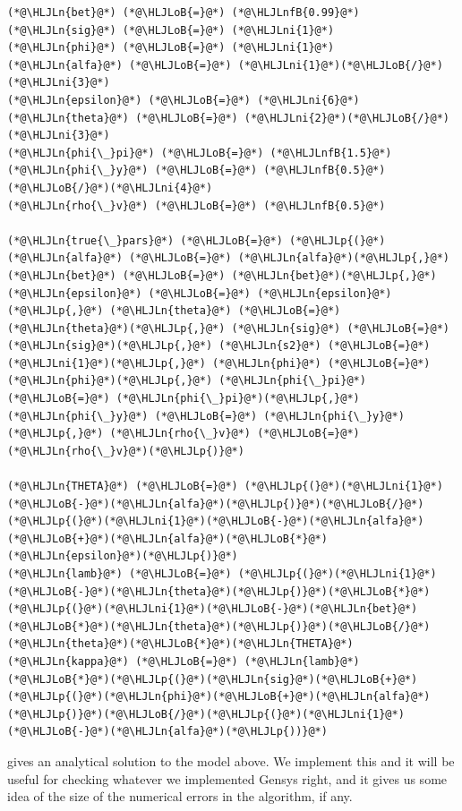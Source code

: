 \documentclass[12pt,a4paper]{article}
\newcommand{\HLJLn}[1]{#1}
\newcommand{\HLJLnfB}[1]{\textcolor[RGB]{59,151,46}{#1}}
\newcommand{\HLJLni}[1]{\textcolor[RGB]{59,151,46}{#1}}
\newcommand{\HLJLoB}[1]{\textcolor[RGB]{102,102,102}{\textbf{#1}}}
\newcommand{\HLJLp}[1]{#1}
\begin{document}
\begin{lstlisting}
(*@\HLJLn{bet}@*) (*@\HLJLoB{=}@*) (*@\HLJLnfB{0.99}@*)
(*@\HLJLn{sig}@*) (*@\HLJLoB{=}@*) (*@\HLJLni{1}@*)
(*@\HLJLn{phi}@*) (*@\HLJLoB{=}@*) (*@\HLJLni{1}@*)
(*@\HLJLn{alfa}@*) (*@\HLJLoB{=}@*) (*@\HLJLni{1}@*)(*@\HLJLoB{/}@*)(*@\HLJLni{3}@*)
(*@\HLJLn{epsilon}@*) (*@\HLJLoB{=}@*) (*@\HLJLni{6}@*)
(*@\HLJLn{theta}@*) (*@\HLJLoB{=}@*) (*@\HLJLni{2}@*)(*@\HLJLoB{/}@*)(*@\HLJLni{3}@*)
(*@\HLJLn{phi{\_}pi}@*) (*@\HLJLoB{=}@*) (*@\HLJLnfB{1.5}@*)
(*@\HLJLn{phi{\_}y}@*) (*@\HLJLoB{=}@*) (*@\HLJLnfB{0.5}@*)(*@\HLJLoB{/}@*)(*@\HLJLni{4}@*)
(*@\HLJLn{rho{\_}v}@*) (*@\HLJLoB{=}@*) (*@\HLJLnfB{0.5}@*)

(*@\HLJLn{true{\_}pars}@*) (*@\HLJLoB{=}@*) (*@\HLJLp{(}@*)(*@\HLJLn{alfa}@*) (*@\HLJLoB{=}@*) (*@\HLJLn{alfa}@*)(*@\HLJLp{,}@*) (*@\HLJLn{bet}@*) (*@\HLJLoB{=}@*) (*@\HLJLn{bet}@*)(*@\HLJLp{,}@*) (*@\HLJLn{epsilon}@*) (*@\HLJLoB{=}@*) (*@\HLJLn{epsilon}@*)(*@\HLJLp{,}@*) (*@\HLJLn{theta}@*) (*@\HLJLoB{=}@*) (*@\HLJLn{theta}@*)(*@\HLJLp{,}@*) (*@\HLJLn{sig}@*) (*@\HLJLoB{=}@*) (*@\HLJLn{sig}@*)(*@\HLJLp{,}@*) (*@\HLJLn{s2}@*) (*@\HLJLoB{=}@*) (*@\HLJLni{1}@*)(*@\HLJLp{,}@*) (*@\HLJLn{phi}@*) (*@\HLJLoB{=}@*) (*@\HLJLn{phi}@*)(*@\HLJLp{,}@*) (*@\HLJLn{phi{\_}pi}@*) (*@\HLJLoB{=}@*) (*@\HLJLn{phi{\_}pi}@*)(*@\HLJLp{,}@*) (*@\HLJLn{phi{\_}y}@*) (*@\HLJLoB{=}@*) (*@\HLJLn{phi{\_}y}@*)(*@\HLJLp{,}@*) (*@\HLJLn{rho{\_}v}@*) (*@\HLJLoB{=}@*) (*@\HLJLn{rho{\_}v}@*)(*@\HLJLp{)}@*)

(*@\HLJLn{THETA}@*) (*@\HLJLoB{=}@*) (*@\HLJLp{(}@*)(*@\HLJLni{1}@*)(*@\HLJLoB{-}@*)(*@\HLJLn{alfa}@*)(*@\HLJLp{)}@*)(*@\HLJLoB{/}@*)(*@\HLJLp{(}@*)(*@\HLJLni{1}@*)(*@\HLJLoB{-}@*)(*@\HLJLn{alfa}@*)(*@\HLJLoB{+}@*)(*@\HLJLn{alfa}@*)(*@\HLJLoB{*}@*)(*@\HLJLn{epsilon}@*)(*@\HLJLp{)}@*)
(*@\HLJLn{lamb}@*) (*@\HLJLoB{=}@*) (*@\HLJLp{(}@*)(*@\HLJLni{1}@*)(*@\HLJLoB{-}@*)(*@\HLJLn{theta}@*)(*@\HLJLp{)}@*)(*@\HLJLoB{*}@*)(*@\HLJLp{(}@*)(*@\HLJLni{1}@*)(*@\HLJLoB{-}@*)(*@\HLJLn{bet}@*)(*@\HLJLoB{*}@*)(*@\HLJLn{theta}@*)(*@\HLJLp{)}@*)(*@\HLJLoB{/}@*)(*@\HLJLn{theta}@*)(*@\HLJLoB{*}@*)(*@\HLJLn{THETA}@*)
(*@\HLJLn{kappa}@*) (*@\HLJLoB{=}@*) (*@\HLJLn{lamb}@*)(*@\HLJLoB{*}@*)(*@\HLJLp{(}@*)(*@\HLJLn{sig}@*)(*@\HLJLoB{+}@*)(*@\HLJLp{(}@*)(*@\HLJLn{phi}@*)(*@\HLJLoB{+}@*)(*@\HLJLn{alfa}@*)(*@\HLJLp{)}@*)(*@\HLJLoB{/}@*)(*@\HLJLp{(}@*)(*@\HLJLni{1}@*)(*@\HLJLoB{-}@*)(*@\HLJLn{alfa}@*)(*@\HLJLp{))}@*)
\end{lstlisting}

\cite{Gali2009} gives an analytical solution to the model above. We implement this and it will be useful for checking whatever we implemented Gensys right, and it gives us some idea of the size of the numerical errors in the algorithm, if any.
\end{document}

